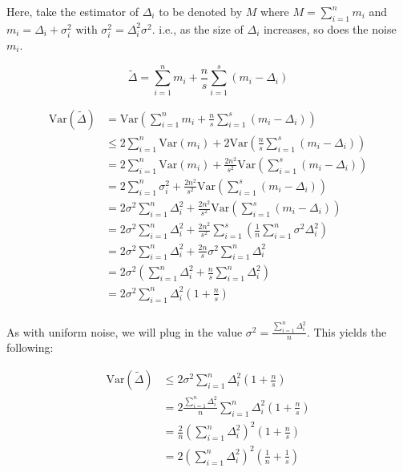 \documentclass[11pt]{article}
\begin{document}
Here, take the estimator of $\Delta_i$ to be denoted by $M$ where $M = \sum_{i = 1}^{n} m_i$ and $m_i = \Delta_i + \sigma_i^2$ with $\sigma_i^2 = \Delta_i^2 \sigma^2$.
i.e., as the size of $\Delta_i$ increases, so does the noise $m_i$.

\[
\tilde{\Delta} = \sum_{i = 1}^{n} m_i + \frac{n}{s} \sum_{i = 1}^{s} (m_i - \Delta_i)
\]

\[
\begin{aligned}
\mathrm{Var}(\tilde{\Delta}) &= \mathrm{Var}( \sum_{i = 1}^{n} m_i + \frac{n}{s} \sum_{i = 1}^{s} (m_i - \Delta_i)) \\
&\leq 2\sum_{i = 1}^{n} \mathrm{Var}(m_i) + 2\mathrm{Var}(\frac{n}{s} \sum_{i = 1}^{s} (m_i - \Delta_i)) \\
&= 2\sum_{i = 1}^{n} \mathrm{Var}(m_i) + \frac{2n^2}{s^2} \mathrm{Var}(\sum_{i = 1}^{s} (m_i - \Delta_i)) \\
&= 2\sum_{i = 1}^{n} \sigma_i^2 + \frac{2n^2}{s^2} \mathrm{Var}(\sum_{i = 1}^{s} (m_i - \Delta_i)) \\
&= 2\sigma^2\sum_{i = 1}^{n} \Delta_i^2 + \frac{2n^2}{s^2} \mathrm{Var}(\sum_{i = 1}^{s} (m_i - \Delta_i)) \\
&= 2\sigma^2\sum_{i = 1}^{n} \Delta_i^2 + \frac{2n^2}{s^2}\sum_{i = 1}^{s} (\frac{1}{n}\sum_{i = 1}^{n}\sigma^2\Delta_i^2) \\
&= 2\sigma^2\sum_{i = 1}^{n} \Delta_i^2 + \frac{2n}{s}\sigma^2\sum_{i = 1}^{n}\Delta_i^2 \\
&= 2\sigma^2(\sum_{i = 1}^{n} \Delta_i^2 + \frac{n}{s}\sum_{i = 1}^{n}\Delta_i^2) \\
&= 2\sigma^2\sum_{i = 1}^{n} \Delta_i^2(1 + \frac{n}{s}) \\
\end{aligned}
\]

As with uniform noise, we will plug in the value $\sigma^2 = \frac{\sum_{i = 1}^{n}\Delta_i^2}{n}$.
This yields the following:

\[
\begin{aligned}
\mathrm{Var}(\tilde{\Delta}) &\leq 2\sigma^2\sum_{i = 1}^{n} \Delta_i^2(1 + \frac{n}{s}) \\
&= 2\frac{\sum_{i = 1}^{n}\Delta_i^2}{n}\sum_{i = 1}^{n} \Delta_i^2(1 + \frac{n}{s}) \\
&= \frac{2}{n}(\sum_{i = 1}^{n}\Delta_i^2)^2(1 + \frac{n}{s}) \\
&= 2(\sum_{i = 1}^{n}\Delta_i^2)^2(\frac{1}{n} + \frac{1}{s}) \\
\end{aligned}
\]
\end{document}
